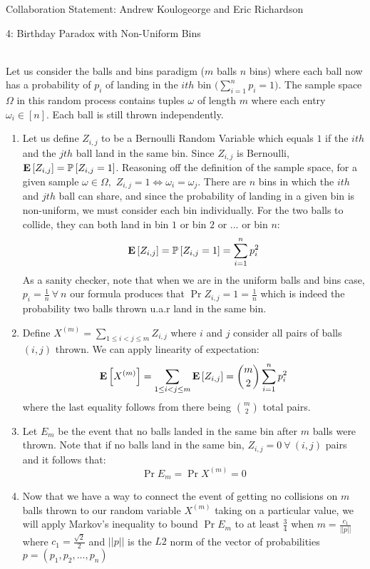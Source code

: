 \documentclass[12pt]{article}
\begin{document}

Collaboration Statement: Andrew Koulogeorge and Eric Richardson 

\begin{problem}{4: Birthday Paradox with Non-Uniform Bins}
\end{problem}
\begin{solution} \ \\
Let us consider the balls and bins paradigm ($m$ balls $n$ bins) where each ball now has a probability of $p_i$ of landing in the $ith$ bin $\big( \sum_{i=1}^{n}{p_i} = 1\big)$. The sample space $\Omega$ in this random process contains tuples $\omega$ of length $m$ where each entry $\omega_i \in [n]$. Each ball is still thrown independently.
\begin{enumerate}[label=(\alph*)]
    \item Let us define $Z_{i,j}$ to be a Bernoulli Random Variable which equals $1$ if the $ith$ and the $jth$ ball land in the same bin. Since $Z_{i,j}$ is Bernoulli, $\mathbf{E}\left[Z_{i,j}\right] = \mathbb{P}\left[Z_{i,j}=1\right]$. Reasoning off the definition of the sample space, for a given sample $\omega\in \Omega,$ $Z_{i,j}=1 \iff \omega_i=\omega_j$. There are $n$ bins in which the $ith$ and $jth$ ball can share, and since the probability of landing in a given bin is non-uniform, we must consider each bin individually. For the two balls to collide, they can both land in bin $1$ or bin $2$ or ... or bin $n$:
    \[
    \mathbf{E}\left[Z_{i,j}\right] = \mathbb{P}\left[Z_{i,j}=1\right] = \sum_{i=1}^{n}{p_i^2}
    \]
    As a sanity checker, note that when we are in the uniform balls and bins case, $p_i = \frac{1}{n}~\forall~n$ our formula produces that $ \Pr{Z_{i,j}=1} = \frac{1}{n}$ which is indeed the probability two balls thrown u.a.r land in the same bin.
    \item Define $X^{(m)} = \sum_{1\leq i < j \leq m}{Z_{i,j}}$ where $i$ and $j$ consider all pairs of balls $(i,j)$ thrown. We can apply linearity of expectation:
    \[
    \mathbf{E}\left[X^{(m)}\right] = \sum_{1\leq i < j \leq m}{\mathbf{E}\left[Z_{i,j}\right]} = \binom{m}{2}\sum_{i=1}^{n}{p_i^2}
    \]
    where the last equality follows from there being $\binom{m}{2}$ total pairs.
    \item Let $E_m$ be the event that no balls landed in the same bin after $m$ balls were thrown. Note that if no balls land in the same bin, $Z_{i,j}=0~\forall~(i,j)$ pairs and it follows that:
    \[
    \Pr{E_m} = \Pr{X^{(m)} = 0}
    \]
    \item Now that we have a way to connect the event of getting no collisions on $m$ balls thrown to our random variable $X^{(m)}$ taking on a particular value, we will apply Markov's inequality to bound $\Pr{E_m}$ to at least $\frac{3}{4}$ when $m = \frac{c_1}{||p||}$ where $c_1 = \frac{\sqrt{2}}{2}$ and $||p||$ is the $L2$ norm of the vector of probabilities $p = (p_1,p_2, ..., p_n)$

\end{enumerate}
\end{solution}
\end{document}

